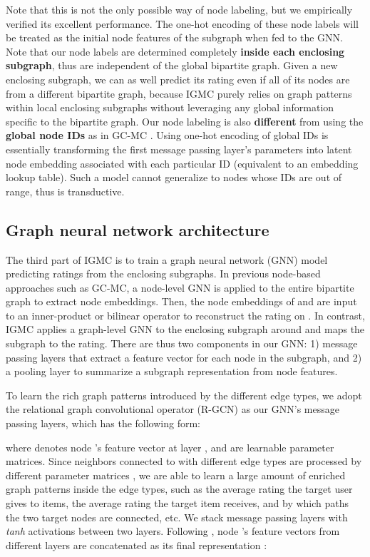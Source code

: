 \documentclass{article} \usepackage{iclr2020_conference,times}
\begin{document}
Note that this is not the only possible way of node labeling, but we empirically verified its excellent performance. The one-hot encoding of these node labels will be treated as the initial node features  of the subgraph when fed to the GNN. Note that our node labels are determined completely \textbf{inside each enclosing subgraph}, thus are independent of the global bipartite graph. Given a new enclosing subgraph, we can as well predict its rating even if all of its nodes are from a different bipartite graph, because IGMC purely relies on graph patterns within local enclosing subgraphs without leveraging any global information specific to the bipartite graph.
Our node labeling is also \textbf{different} from using the \textbf{global node IDs} as in GC-MC \citep{berg2017graph}. Using one-hot encoding of global IDs is essentially transforming the first message passing layer's parameters into latent node embedding associated with each particular ID (equivalent to an embedding lookup table). Such a model cannot generalize to nodes whose IDs are out of range, thus is transductive. 



\subsection{Graph neural network architecture}
The third part of IGMC is to train a graph neural network (GNN) model predicting ratings from the enclosing subgraphs. In previous node-based approaches such as GC-MC, a node-level GNN is applied to the entire bipartite graph to extract node embeddings. Then, the node embeddings of  and  are input to an inner-product or bilinear operator to reconstruct the rating on . In contrast, IGMC applies a graph-level GNN to the enclosing subgraph around  and maps the subgraph to the rating.
There are thus two components in our GNN: 1) message passing layers that extract a feature vector for each node in the subgraph, and 2) a pooling layer to summarize a subgraph representation from node features. 

To learn the rich graph patterns introduced by the different edge types, we adopt the relational graph convolutional operator (R-GCN) \citep{schlichtkrull2018modeling} as our GNN's message passing layers, which has the following form:

where  denotes node 's feature vector at layer ,  and  are learnable parameter matrices. Since neighbors  connected to  with different edge types  are processed by different parameter matrices , we are able to learn a large amount of enriched graph patterns inside the edge types, such as the average rating the target user gives to items, the average rating the target item receives, and by which paths the two target nodes are connected, etc. We stack  message passing layers with \textit{tanh} activations between two layers. Following \citep{zhang2018end,xu2018powerful}, node 's feature vectors from different layers are concatenated as its final representation :
\end{document}
